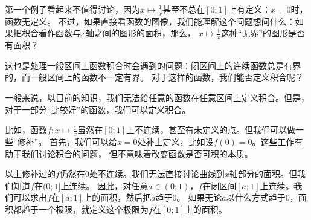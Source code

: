 \documentclass[12pt,UTF8,fontset=none]{ctexbook}
\begin{document}
\begin{figure}[h]
\end{figure}

第一个例子看起来不值得讨论，因为$x\mapsto\frac{1}{x}$甚至不总在$[0;1]$上有定义：$x=0$时，函数无定义。
不过，如果直接看函数的图像，我们能理解这个问题想问什么：如果把积合看作函数与$x$轴之间的图形的面积，那么，
$x\mapsto\frac{1}{x}$这种“无界”的图形是否有面积？

这也是处理一般区间上函数积合时会遇到的问题：闭区间上的连续函数总是有界的，而一般区间上的函数不一定有界。
对于这样的函数，我们能否定义积合呢？

一般来说，以目前的知识，我们无法给任意的函数在任意区间上定义积合。但是，对于一部分“比较好”的函数，我们可以定义积合。

比如，函数$f: x\mapsto\frac{1}{x}$虽然在$[0;1]$上不连续，甚至有未定义的点。但我们可以做一些“修补”。
首先，我们可以给$x=0$处补上定义，比如设$f(0) = 0$。这些工作有助于我们讨论积合的问题，
但不意味着改变函数是否可积的本质。

以上修补过的$f$仍然在$0$处不连续。我们无法直接讨论曲线到$x$轴部分的面积。但我们知道$f$在$(0;1]$上连续。
因此，对任意$a\in(0;1)$，$f$在闭区间$[a;1]$上连续。我们可以求出$f$在$[a;1]$上的面积，然后把$a$趋于$0$。
如果无论$a$以什么方式趋于$0$，面积都趋于一个极限，就定义这个极限为$f$在$[0;1]$上的面积。
\end{document}
